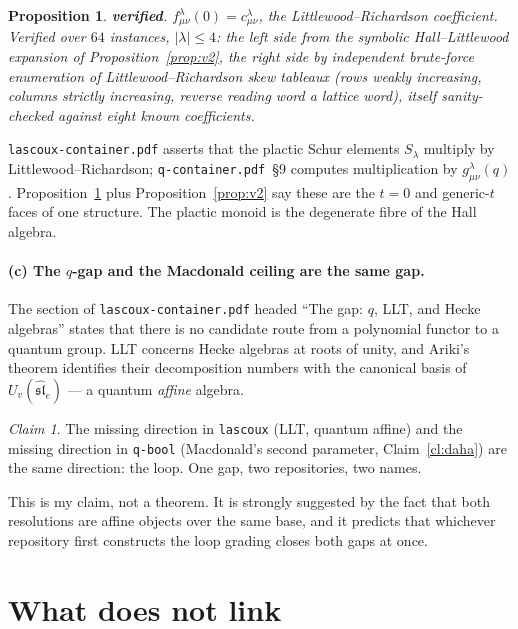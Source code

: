 \documentclass[11pt,a4paper]{article}
\newtheorem{proposition}[theorem]{Proposition}
\theoremstyle{definition}
\theoremstyle{remark}
\newtheorem{claim}[theorem]{Claim}
\newcommand{\OK}{\textcolor{okgreen}{\textbf{verified}}}
\begin{document}
\begin{proposition}\label{prop:v4}
\OK. $f^{\lambda}_{\mu\nu}(0) = c^{\lambda}_{\mu\nu}$, the
Littlewood--Richardson coefficient. Verified over $64$ instances,
$|\lambda| \le 4$: the left side from the symbolic Hall--Littlewood expansion of
Proposition~\ref{prop:v2}, the right side by independent brute-force
enumeration of Littlewood--Richardson skew tableaux (rows weakly increasing,
columns strictly increasing, reverse reading word a lattice word), itself
sanity-checked against eight known coefficients.
\end{proposition}

\texttt{lascoux-container.pdf} asserts that the plactic Schur elements
$S_\lambda$ multiply by Littlewood--Richardson;
\texttt{q-container.pdf}~\S9 computes multiplication by
$g^{\lambda}_{\mu\nu}(q)$. Proposition~\ref{prop:v4} plus
Proposition~\ref{prop:v2} say these are the $t=0$ and generic-$t$ faces of one
structure. The plactic monoid is the degenerate fibre of the Hall algebra.

\paragraph{(c) The $q$-gap and the Macdonald ceiling are the same gap.}
The section of \texttt{lascoux-container.pdf} headed ``The gap: $q$, LLT, and
Hecke algebras'' states that there is no candidate route from a polynomial
functor to a quantum group.
LLT concerns Hecke algebras at roots of unity, and Ariki's theorem
\cite{Ariki} identifies their decomposition numbers with the canonical basis of
$U_v(\widehat{\mathfrak{sl}}_e)$ --- a quantum \emph{affine} algebra.

\begin{claim}\label{cl:samegap}
The missing direction in \texttt{lascoux} (LLT, quantum affine) and the missing
direction in \texttt{q-bool} (Macdonald's second parameter, Claim~\ref{cl:daha})
are the same direction: the loop. One gap, two repositories, two names.
\end{claim}

This is my claim, not a theorem. It is strongly suggested by the fact that both
resolutions are affine objects over the same base, and it predicts that
whichever repository first constructs the loop grading closes both gaps at once.

\section{What does not link}\label{sec:not}
\end{document}
